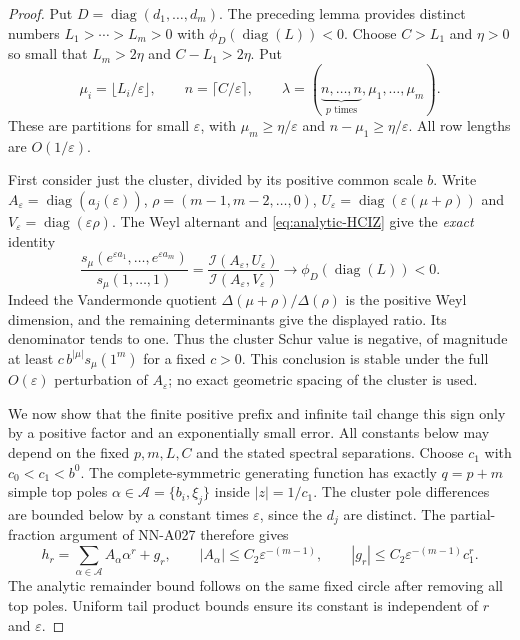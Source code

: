 \begin{proof}
Put $D=\operatorname{diag}(d_1,\ldots,d_m)$. The preceding lemma
provides distinct numbers
$L_1>\cdots>L_m>0$ with
$\phi_D(\operatorname{diag}(L))<0$. Choose $C>L_1$ and $\eta>0$
so small that $L_m>2\eta$ and $C-L_1>2\eta$. Put
\[
 \mu_i=\lfloor L_i/\varepsilon\rfloor,\qquad
 n=\lceil C/\varepsilon\rceil,\qquad
 \lambda=(\underbrace{n,\ldots,n}_{p\text{ times}},
                                  \mu_1,\ldots,\mu_m).
\]
These are partitions for small $\varepsilon$, with
$\mu_m\ge\eta/\varepsilon$ and
$n-\mu_1\ge\eta/\varepsilon$. All row lengths are $O(1/\varepsilon)$.

First consider just the cluster, divided by its positive common scale
$b$. Write $A_\varepsilon=\operatorname{diag}(a_j(\varepsilon))$,
$\rho=(m-1,m-2,\ldots,0)$,
$U_\varepsilon=\operatorname{diag}(\varepsilon(\mu+\rho))$ and
$V_\varepsilon=\operatorname{diag}(\varepsilon\rho)$.
The Weyl alternant and \eqref{eq:analytic-HCIZ} give the \emph{exact}
identity
\begin{equation}\label{eq:analytic-Schur-orbital-limit}
 \frac{s_\mu(e^{\varepsilon a_1},\ldots,e^{\varepsilon a_m})}
      {s_\mu(1,\ldots,1)}
   =\frac{\mathcal I(A_\varepsilon,U_\varepsilon)}
          {\mathcal I(A_\varepsilon,V_\varepsilon)}
      \longrightarrow\phi_D(\operatorname{diag}(L))<0.
\end{equation}
Indeed the Vandermonde quotient
$\Delta(\mu+\rho)/\Delta(\rho)$ is the positive Weyl dimension,
and the remaining determinants give the displayed ratio. Its denominator
tends to one. Thus the cluster Schur value is negative, of magnitude
at least $c\,b^{|\mu|}s_\mu(1^m)$ for a fixed $c>0$.
This conclusion is stable under the full $O(\varepsilon)$ perturbation
of $A_\varepsilon$; no exact geometric spacing of the cluster is used.

We now show that the finite positive prefix and infinite tail change
this sign only by a positive factor and an exponentially small error.
All constants below may depend on the fixed $p,m,L,C$ and the stated
spectral separations. Choose $c_1$ with $c_0<c_1<b^0$.
The complete-symmetric generating function has exactly $q=p+m$
simple top poles $\alpha\in\mathcal A=\{b_i,\xi_j\}$ inside
$|z|=1/c_1$. The cluster pole differences are bounded below by a
constant times $\varepsilon$, since the $d_j$ are distinct. The
partial-fraction argument of NN-A027 therefore gives
\begin{equation}\label{eq:analytic-full-cluster-poles}
 h_r=\sum_{\alpha\in\mathcal A}A_\alpha\alpha^r+g_r,
 \qquad |A_\alpha|\le C_2\varepsilon^{-(m-1)},\qquad
 |g_r|\le C_2\varepsilon^{-(m-1)}c_1^r.
\end{equation}
The analytic remainder bound follows on the same fixed circle after
removing all top poles. Uniform tail product bounds ensure its constant
is independent of $r$ and $\varepsilon$.


\end{proof}

